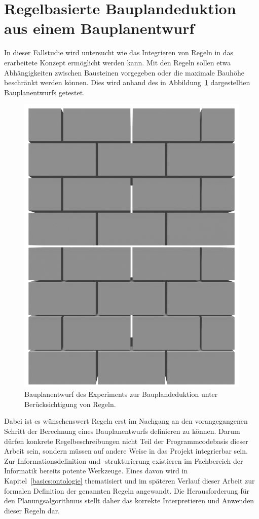 \section{Regelbasierte Bauplandeduktion aus einem Bauplanentwurf}\label{scenarios:scenario4}
In dieser Fallstudie wird untersucht wie das Integrieren von Regeln in das erarbeitete Konzept ermöglicht werden kann.
Mit den Regeln sollen etwa Abhängigkeiten zwischen Bausteinen vorgegeben oder die maximale Bauhöhe beschränkt werden können.
Dies wird anhand des in Abbildung~\ref{fig:scenarios:Scenario4 Experiment} dargestellten Bauplanentwurfs getestet.
\begin{figure}[ht]
  \centering
  \includegraphics[width=0.3\columnwidth]{fig/scenario4_render.png}
  \caption{Bauplanentwurf des Experiments zur Bauplandeduktion unter Berücksichtigung von Regeln.}\label{fig:scenarios:Scenario4 Experiment}
\end{figure}
Dabei ist es wünschenswert Regeln erst im Nachgang an den vorangegangenen Schritt der Berechnung eines Bauplanentwurfs definieren zu können.
Darum dürfen konkrete Regelbeschreibungen nicht Teil der Programmcodebasis dieser Arbeit sein, sondern müssen auf andere Weise in das Projekt integrierbar sein.
Zur Informationsdefinition und -strukturierung existieren im Fachbereich der Informatik bereits potente Werkzeuge.
Eines davon wird in Kapitel~\ref{basics:ontologie} thematisiert und im späteren Verlauf dieser Arbeit zur formalen Definition der genannten Regeln angewandt.
Die Herausforderung für den Planungsalgorithmus stellt daher das korrekte Interpretieren und Anwenden dieser Regeln dar.
